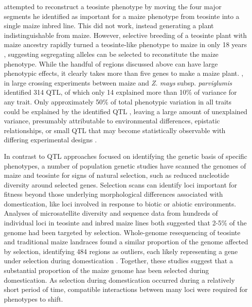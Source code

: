 \documentclass[9pt,twocolumn,twoside]{rilabRxiv}
\begin{document}
\citet{mangelsdorf1974} attempted to reconstruct a teosinte phenotype by moving the four major segments he identified as important for a maize phenotype from teosinte into a single maize inbred line.
This did not work, instead generating a plant indistinguishable from maize.
However, selective breeding of a teosinte plant with maize ancestry rapidly turned a teosinte-like phenotype to maize in only 18 years \citep{weatherwax1924, collins1925}, suggesting segregating alleles can be selected to reconstitute the maize phenotype.
While the handful of regions discussed above can have large phenotypic effects, it clearly takes more than five genes to make a maize plant.
\citet{briggs2007}, in large crossing experiments between maize and \textit{Z. mays} subsp. \textit{parviglumis} identified 314 QTL, of which only 14 explained more than 10\% of variance for any trait.
Only approximately 50\% of total phenotypic variation in all traits could be explained by the identified QTL \citep{briggs2007}, leaving a large amount of unexplained variance, presumably attributable to environmental differences, epistatic relationships, or small QTL that may become statistically observable with differing experimental designs \citep{yu2008}.

In contrast to QTL approaches focused on identifying the genetic basis of specific phenotypes, a number of population genetic studies have scanned the genomes of maize and teosinte for signs of natural selection, such as reduced nucleotide diversity around selected genes.
Selection scans can identify loci important for fitness beyond those underlying morphological differences associated with domestication, like loci involved in response to biotic or abiotic environments.
Analyses of microsatellite diversity \citep{vigouroux2002, vigouroux2005} and sequence data from hundreds of individual loci in teosinte and inbred maize lines \citep{wright2005} both suggested that 2-5\% of the genome had been targeted by selection.
Whole-genome resequencing of teosinte and traditional maize landraces found a similar proportion of the genome affected by selection, identifying 484 regions as outliers, each likely representing a gene under selection during domestication \citep{hufford2012natgen}.
Together, these studies suggest that a substantial proportion of the maize genome has been selected during domestication.
As selection during domestication occurred during a relatively short period of time, compatible interactions between many loci were required for phenotypes to shift.
\end{document}
